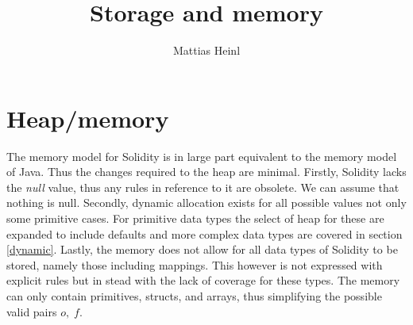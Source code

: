 \documentclass{article}
\title{Storage and memory}
\author{Mattias Heinl}
\date{}
\begin{document}
	\maketitle
	
	\section{Heap/memory}
	The memory model for Solidity is in large part equivalent to the memory model of Java. Thus the changes required to the heap are minimal. Firstly, Solidity lacks the \textit{null} value, thus any rules in reference to it are obsolete. We can assume that nothing is null. Secondly, dynamic allocation exists for all possible values not only some primitive cases. For primitive data types the select of heap for these are expanded to include defaults and more complex data types are covered in section \ref{dynamic}. Lastly, the memory does not allow for all data types of Solidity to be stored, namely those including mappings. This however is not expressed with explicit rules but in stead with the lack of coverage for these types. The memory can only contain primitives, structs, and arrays, thus simplifying the possible valid pairs $o,\; f$.
	
\end{document}
